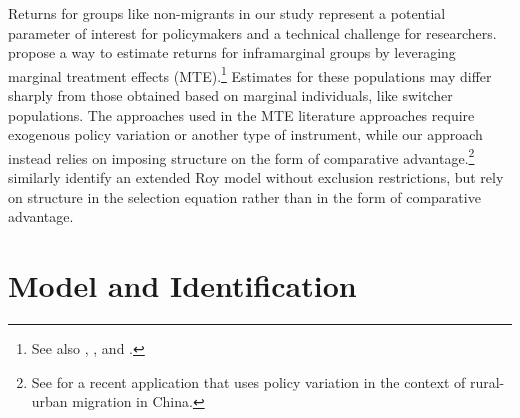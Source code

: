 \documentclass[12pt]{article}
\begin{document}
Returns for groups like non-migrants in our study represent a potential parameter of interest for policymakers and a technical challenge for researchers. 
\cite{heckmanLocalInstrumentalVariables1999} propose a way to estimate returns for inframarginal groups by leveraging marginal treatment effects (MTE).\footnote{See also \cite{heckmanStructuralEquations2005}, \cite{heckmanComparingIVwithStructural2010}, and \cite{cornelissenFromLATEtoMTE2016}.}
Estimates for these populations may differ sharply from those obtained based on marginal individuals, like switcher populations.
The approaches used in the MTE literature approaches require exogenous policy variation or another type of instrument, while our approach instead relies on imposing structure on the form of comparative advantage.\footnote{See \cite{gaiRuralPensionsLabor2025} for a recent application that uses policy variation in the context of rural-urban migration in China.}
\cite{dhaultfoeuilleInferenceExtendedRoy2013} similarly identify an extended Roy model without exclusion restrictions, but rely on structure in the selection equation rather than in the form of comparative advantage.

\section{Model and Identification}\label{sec:model_identification}

\end{document}

